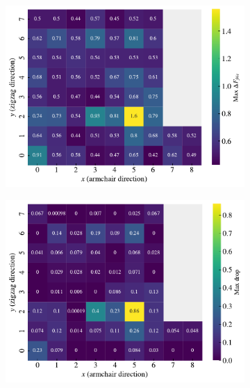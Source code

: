 \begin{figure}[H]
  \centering
  \begin{subfigure}[t]{0.49\textwidth}
      \centering
      \includegraphics[width=\textwidth]{figures/search/ref_search_diff_pop_5_3_1_ref_search.pdf}
      \caption{}
  \end{subfigure}
  \hfill
  \begin{subfigure}[t]{0.49\textwidth}
      \centering
      \includegraphics[width=\textwidth]{figures/search/ref_search_drop_pop_5_3_1_ref_search.pdf}
      \caption{}
  \end{subfigure}
  \hfill
  \begin{subfigure}[t]{0.49\textwidth}

\end{subfigure}
\end{figure}
